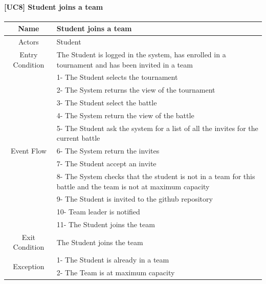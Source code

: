 \documentclass{article}
\begin{document}
\paragraph{[UC8] Student joins a team}
\begin{center}
\begin{tabular}{|c|m{40em}|}
\hline
Name & Student joins a team\\
\hline
\multirow{1}{4em}{Actors}
& Student\\
\hline
Entry Condition & The Student is logged in the system, has enrolled in a tournament and has been invited in a team\\
\hline
\multirow{11}{4em}{Event Flow}
& 1- The Student selects the tournament\\
& 2- The System returns the view of the tournament\\
& 3- The Student select the battle\\
& 4- The System return the view of the battle\\
& 5- The Student ask the system for a list of all the invites for the current battle\\
& 6- The System return the invites\\
& 7- The Student accept an invite\\
& 8- The System checks that the student is not in a team for this battle and the team is not at maximum capacity\\
& 9- The Student is invited to the github repository\\
& 10- Team leader is notified\\
& 11- The Student joins the team\\
\hline
Exit Condition & The Student joins the team\\
\hline
\multirow{2}{4em}{Exception}
& 1- The Student is already in a team\\
& 2- The Team is at maximum capacity\\
\hline
\end{tabular}
\end{center}

\newpage
\end{document}
